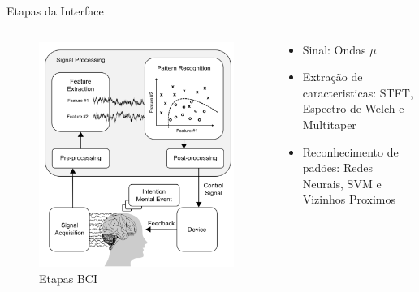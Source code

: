 \documentclass{beamer}
\begin{document}
\begin{frame}{Etapas da Interface}
    \begin{columns}
        \begin{column}{0.5\textwidth}
           \begin{center}
               \begin{figure}
                   \centering
                   \includegraphics[scale=.30]{Images/bci-stages.png}
                   \caption{Etapas BCI\cite{Rao2010}}
                   \label{fig:Estagio_BCI}
               \end{figure}
           \end{center}
       \end{column}
       \begin{column}{0.5\textwidth}
       \begin{itemize}
           \item Sinal: Ondas $\mu$
           \item Extra\c{c}\~ao de caracteristicas: STFT, Espectro de Welch e Multitaper
           \item Reconhecimento de pad\~oes: Redes Neurais, SVM e Vizinhos Proximos
       \end{itemize}
       \end{column}
    \end{columns}
\end{frame}
\end{document}
